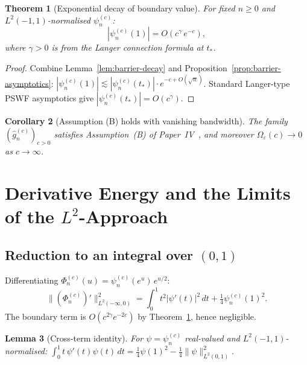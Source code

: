 \documentclass[12pt,a4paper]{amsart}
\newtheorem{theorem}{Theorem}[section]
\newtheorem{lemma}[theorem]{Lemma}
\newtheorem{corollary}[theorem]{Corollary}
\theoremstyle{remark}
\begin{document}
\begin{theorem}[Exponential decay of boundary value]
\label{thm:boundary-decay}
For fixed $n \ge 0$ and $L^2(-1,1)$-normalised $\psi_n^{(c)}$:
\begin{equation}
\label{eq:psi-1-exp-decay}
|\psi_n^{(c)}(1)| = O\!\left(c^{\gamma}\,e^{-c}\right),
\end{equation}
where $\gamma > 0$ is from the Langer connection formula at $t_*$.
\end{theorem}

\begin{proof}
Combine Lemma~\ref{lem:barrier-decay} and
Proposition~\ref{prop:barrier-asymptotics}:
$|\psi_n^{(c)}(1)| \lesssim |\psi_n^{(c)}(t_*)| \cdot e^{-c+O(\sqrt{n})}$.
Standard Langer-type PSWF asymptotics give $|\psi_n^{(c)}(t_*)| = O(c^\gamma)$.
\end{proof}

\begin{corollary}[Assumption (B) holds with vanishing bandwidth]
\label{cor:assumption-B}
The family $(\widehat{g}_n^{(c)})_{c > 0}$ satisfies Assumption~(B) of
Paper~IV~\cite{PaperIV}, and moreover $\Omega_\varepsilon(c) \to 0$ as $c \to \infty$.
\end{corollary}

\section{Derivative Energy and the Limits of the $L^2$-Approach}
\label{sec:energy-bound}

\subsection{Reduction to an integral over $(0,1)$}
\label{ssec:reduction}

Differentiating $\Phi_n^{(c)}(u) = \psi_n^{(c)}(e^u)\,e^{u/2}$:
\begin{equation}
\label{eq:energy-simplified}
\|(\Phi_n^{(c)})'\|_{L^2(-\infty,0)}^2
= \int_0^1 t^2|\psi'(t)|^2\,dt
+ \tfrac{1}{4}\psi_n^{(c)}(1)^2.
\end{equation}
The boundary term is $O(c^{2\gamma}e^{-2c})$ by
Theorem~\ref{thm:boundary-decay}, hence negligible.

\begin{lemma}[Cross-term identity]
\label{lem:cross-term-energy}
For $\psi = \psi_n^{(c)}$ real-valued and $L^2(-1,1)$-normalised:
$\int_0^1 t\,\psi'(t)\psi(t)\,dt = \tfrac{1}{4}\psi(1)^2 - \tfrac{1}{4}\|\psi\|_{L^2(0,1)}^2.$
\end{lemma}
\end{document}
